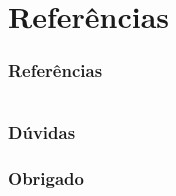 \documentclass[aspectratio=43]{beamer}
\begin{document}

 \section{Referências}
 \begin{frame}[allowframebreaks]
     \frametitle{Referências}
     
 \end{frame}

 \section{}
 \begin{frame}[t]\frametitle{Dúvidas}
     \center
     {\fontsize{250}{300}\selectfont {?}}
 \end{frame}

\begin{frame}[t]\frametitle{Obrigado}
    \center
    {\fontsize{50}{300}\selectfont {Obrigado}}
    
\end{frame}
\end{document}

